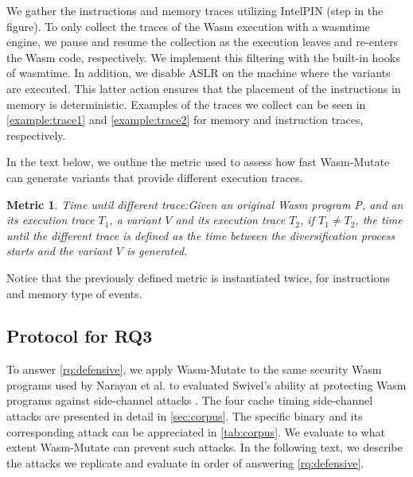 \documentclass[sigplan,screen]{acmart}
\newcommand{\tool}{{\sc Wasm-Mutate}\xspace}
\newcommand{\wasm}{Wasm\xspace}
\newtheorem{metric}{Metric}
\newcommand*\step[1]{
\noindent\tikz[baseline=(char.base)]{
        \node[shape=circle,text=black,draw=black, fill=white,inner sep=1.2pt] (char) {#1};}}
\begin{document}
We gather the instructions and memory traces utilizing IntelPIN \cite{luk2005pin, 10.1145/3478520} (step \step{4} in the figure).
To only collect the traces of the Wasm execution with a wasmtime engine, we pause and resume the collection as the execution leaves and re-enters the Wasm code, respectively.
We implement this filtering with the built-in hooks of wasmtime.
In addition, we disable ASLR on the machine where the variants are executed.
This latter action ensures that the placement of the instructions in memory is deterministic.
Examples of the traces we collect can be seen in \autoref{example:trace1} and \autoref{example:trace2} for memory and instruction traces, respectively.



In the text below, we outline the metric used to assess how fast \tool can generate variants that provide different execution traces.

\begin{metric}{Time until different trace:}\label{metric:mem:sha}
Given an original \wasm program P, and an its execution trace $T_1$, a variant $V$ and its execution trace $T_2$, if $T_1 \neq T_2$, the time until the different trace is defined as the time between the diversification process starts and the variant $V$ is generated.
\end{metric}

Notice that the previously defined metric is instantiated twice, for instructions and memory type of events.

\subsection{Protocol for RQ3}
\label{protocol:rq3}

\newcommand{\poct}{\emph{Cache timing POC}\xspace}
\newcommand{\pocd}{\emph{Differential computing POC}\xspace}
\newcommand{\pocp}{\emph{Port contention POC}\xspace}

To answer \ref{rq:defensive}, we apply \tool to the same security \wasm programs used by Narayan et al. to evaluated Swivel's ability at protecting \wasm programs against side-channel attacks \cite{Swivel}. 
The four cache timing side-channel attacks are presented in detail in \autoref{sec:corpus}. 
The specific binary and its corresponding attack can be appreciated in \autoref{tab:corpus}.
We evaluate to what extent \tool can prevent such attacks.
In the following text, we describe the attacks we replicate and evaluate in order of answering \ref{rq:defensive}.
\end{document}
